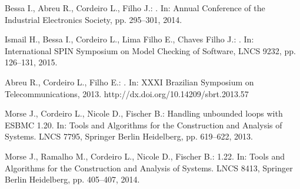 \documentclass{acm_sen_article}
\begin{document}
\begin{thebibliography}{1}
Bessa I., Abreu R., Cordeiro L., Filho J.:
. 
\newblock In: Annual Conference of the Industrial Electronics Society, pp. 295--301, 2014.

Ismail H., Bessa I., Cordeiro L., Lima Filho E., Chaves Filho J.:
. 
\newblock In: International SPIN Symposium on Model Checking of Software, LNCS 9232, pp. 126--131, 2015.

Abreu R., Cordeiro L., Filho E.:
. 
\newblock In: XXXI Brazilian Symposium on Telecommunications, 2013.
\newblock http://dx.doi.org/10.14209/sbrt.2013.57

Morse J., Cordeiro L., Nicole D., Fischer B.:
\newblock Handling unbounded loops with {ESBMC} 1.20.
\newblock In: Tools and Algorithms for the Construction and Analysis of
  Systems. LNCS 7795, Springer Berlin Heidelberg, pp. 619--622, 2013.

Morse J., Ramalho M., Cordeiro L., Nicole D., Fischer B.:
 1.22.
\newblock In: Tools and Algorithms for the Construction and Analysis of
  Systems. LNCS 8413, Springer Berlin Heidelberg, pp. 405--407, 2014.

\end{thebibliography}




\end{document}

